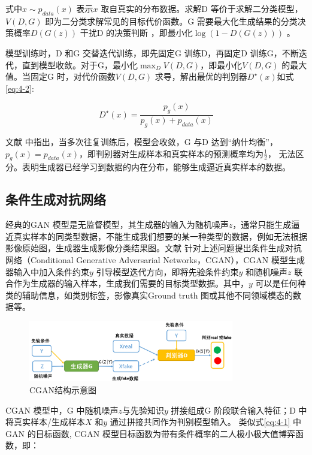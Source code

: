 式中$x \sim p_{data}(x)$ 表示$x$ 取自真实的分布数据。求解D 等价于求解二分类模型，$ V(D,G)$ 即为二分类求解常见的目标代价函数。G 需要最大化生成结果的分类决策概率$D(G(z))$ 干扰D 的决策判断 ，即最小化$\log (1-D(G(z)))$ 。

模型训练时，D 和G 交替迭代训练，即先固定G 训练D，再固定D 训练G，不断迭代，直到模型收敛。对于G，最小化$\mathop{\max}_{D} V(D,G) $，即最小化$V(D,G)$ 的最大值。当固定G 时，对代价函数$V(D,G)$ 求导，解出最优的判别器$D^{\star}(x)$如式\ref{eq:4-2}:

\begin{equation}
  \label{eq:4-2}
  D^{\star}(x) = \frac{p_g(x)}{p_g(x)+p_{data}(x)}
\end{equation}

文献\cite{goodfellow2014generative} 中指出，当多次往复训练后，模型会收敛，G 与D 达到“纳什均衡”，$p_g(x) = p_{data}(x)$，即判别器对生成样本和真实样本的预测概率均为$\frac{1}{2}$， 无法区分。表明生成器已经学习到数据的内在分布，能够生成逼近真实样本的数据。


\subsection{条件生成对抗网络}
\label{sec:first-2}
经典的GAN 模型是无监督模型，其生成器的输入为随机噪声$z$，通常只能生成逼近真实样本的同类型数据，不能生成我们想要的某一种类型的数据，例如无法根据影像原始图，生成器生成影像分类结果图。文献\cite{mirza2014conditional} 针对上述问题提出条件生成对抗网络（Conditional Generative Adversarial Networks，CGAN），CGAN 模型生成器输入中加入条件约束$y$ 引导模型迭代方向，即将先验条件约束$y$ 和随机噪声$z$ 联合作为生成器的输入样本，生成我们需要的目标类型数据。其中，$y$ 可以是任何种类的辅助信息，如类别标签，影像真实Ground truth 图或其他不同领域模态的数据等。

\begin{figure}[htb]
  \centering
  \includegraphics[width=0.8\textwidth]{figures/cgan}
  \caption{CGAN结构示意图}\label{fig:cgan}
\end{figure}

CGAN 模型中，G 中随机噪声$z$与先验知识$y$ 拼接组成G 阶段联合输入特征；D 中将真实样本/生成样本$X$ 和$y$ 通过拼接共同作为判别模型输入。 类似式\ref{eq:4-1} 中GAN 的目标函数, CGAN 模型目标函数为带有条件概率的二人极小极大值博弈函数，即：

